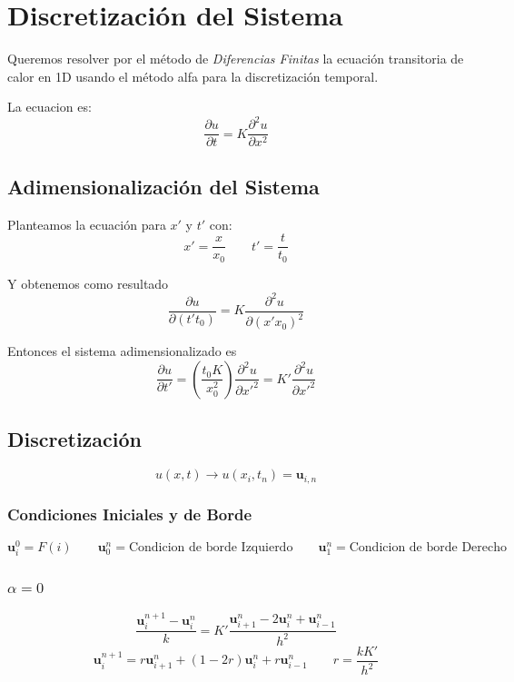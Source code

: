 \documentclass[12pt, a4paper]{article}
\begin{document}
	\grupo{  }
	\maketitle

	\newpage		\printindex \tableofcontents
	
	\section{Discretización del Sistema}
		Queremos resolver por el método de \textit{Diferencias Finitas} la ecuación transitoria de calor en 1D usando el método alfa para la discretización temporal.
		
		La ecuacion es:
		$$\frac{\partial u}{\partial t}=K\frac{\partial^2 u}{\partial x^2}$$
		
		\subsection{Adimensionalización del Sistema}
			Planteamos la ecuación para $x'$ y $t'$ con:
			$$x'=\frac{x}{x_0} \qquad t'=\frac{t}{t_0}$$
			
			Y obtenemos como resultado
			$$\frac{\partial u}{\partial (t' t_0)}=K\frac{\partial^2 u}{\partial (x' x_0)^2}$$
			
			Entonces el sistema adimensionalizado es
			$$\frac{\partial u}{\partial t'}=\left(\frac{t_0 K}{x_0^2}\right)\frac{\partial^2 u}{\partial x'^2}=K'\frac{\partial^2 u}{\partial x'^2}$$
		
		\subsection{Discretización}
			$$u(x,t) \longrightarrow u(x_i,t_n)=\mathbf{u}_{i,n}$$
			
			\subsubsection{Condiciones Iniciales y de Borde}
				$$\mathbf{u}_i^0=F(i) \qquad \mathbf{u}_0^n=\text{Condicion de borde Izquierdo} \qquad \mathbf{u}_1^n=\text{Condicion de borde Derecho}$$
			
			\subsubsection{$\alpha=0$}
				$$\frac{\mathbf{u}_i^{n+1}-\mathbf{u}_i^n}{k}=K'\frac{\mathbf{u}_{i+1}^n-2\mathbf{u}_i^n+\mathbf{u}_{i-1}^n}{h^2}$$
				$$\mathbf{u}_i^{n+1}=r\mathbf{u}_{i+1}^n+(1-2r)\mathbf{u}_i^n+r\mathbf{u}_{i-1}^n \qquad r=\frac{kK'}{h^2}$$
\end{document}
